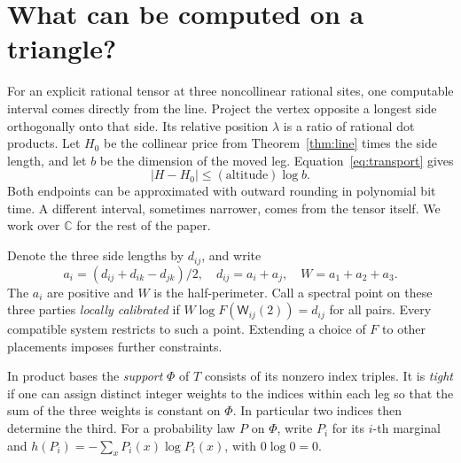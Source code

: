 \documentclass[11pt,letterpaper]{article}
\theoremstyle{definition}
\newcommand{\C}{\mathbb C}
\newcommand{\wire}{\mathsf W}
\begin{document}
\section{What can be computed on a triangle?}
\label{sec:triangle}

For an explicit rational tensor at three noncollinear rational sites, one
computable interval comes directly from the line. Project the vertex opposite
a longest side orthogonally onto that side. Its relative position \(\lambda\)
is a ratio of rational dot products. Let \(H_0\) be the collinear price
from Theorem~\ref{thm:line} times the side length, and let \(b\) be the
dimension of the moved leg. Equation~\eqref{eq:transport} gives
\[
 |H-H_0|\le (\text{altitude})\log b .
\]
Both endpoints can be approximated with outward rounding in polynomial
bit time. A different interval, sometimes narrower, comes from the tensor
itself. We work over \(\C\) for the rest of the paper.

Denote the three side lengths by \(d_{ij}\), and write
\[
 a_i=(d_{ij}+d_{ik}-d_{jk})/2,\quad
 d_{ij}=a_i+a_j,\quad W=a_1+a_2+a_3 .
\]
The \(a_i\) are positive and \(W\) is the half-perimeter. Call a spectral
point on these three parties \emph{locally calibrated} if
\(W\log F(\wire_{ij}(2))=d_{ij}\) for all pairs. Every compatible system
restricts to such a point. Extending a choice of \(F\) to other placements
imposes further constraints.

In product bases the \emph{support} \(\Phi\) of \(T\) consists of its
nonzero index triples. It is \emph{tight} if one can assign distinct
integer weights to the indices within each leg so that the sum of the
three weights is constant on \(\Phi\). In particular two indices then
determine the third. For a probability law \(P\) on \(\Phi\), write
\(P_i\) for its \(i\)-th marginal and
\(h(P_i)=-\sum_xP_i(x)\log P_i(x)\), with \(0\log0=0\).
\end{document}
